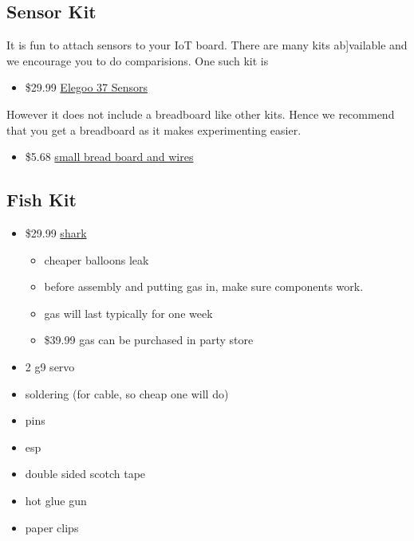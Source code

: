 \subsection{Sensor Kit}\label{sensor-kit}

It is fun to attach sensors to your IoT board. There are many kits
ab{]}vailable and we encourage you to do comparisions. One such kit is

\begin{itemize}
\tightlist
\item
  \$29.99
  \href{https://www.amazon.com/Elegoo-Upgraded-Modules-Tutorial-Arduino/dp/B01MG49ZQ5/ref=sr_1_7?s=electronics\&ie=UTF8\&qid=1499251441\&sr=1-7\&keywords=elegoo}{Elegoo
  37 Sensors}
\end{itemize}

However it does not include a breadboard like other kits. Hence we
recommend that you get a breadboard as it makes experimenting easier.

\begin{itemize}
\tightlist
\item
  \$5.68
  \href{https://www.amazon.com/Elegoo-Premium-Female-tie-points-breadboard/dp/B06XB8TZVC/ref=sr_1_23?s=electronics\&ie=UTF8\&qid=1499251600\&sr=1-23\&keywords=elegoo}{small
  bread board and wires}
\end{itemize}

\subsection{Fish Kit}\label{fish-kit}

\begin{itemize}
\tightlist
\item
  \$29.99
  \href{https://www.amazon.com/Swimmer-Inflatable-Flying-Replacement-Balloon/dp/B00658LN3E/ref=pd_bxgy_21_img_2?_encoding=UTF8\&pd_rd_i=B00658LN3E\&pd_rd_r=F71N2YCYE6Z0BCCEPQJC\&pd_rd_w=AwYab\&pd_rd_wg=rHTnv\&psc=1\&refRID=F71N2YCYE6Z0BCCEPQJC}{shark}

  \begin{itemize}
  \tightlist
  \item
    cheaper balloons leak
  \item
    before assembly and putting gas in, make sure components work.
  \item
    gas will last typically for one week
  \item
    \$39.99 gas can be purchased in party store
  \end{itemize}
\item
  2 g9 servo
\item
  soldering (for cable, so cheap one will do)
\item
  pins
\item
  esp
\item
  double sided scotch tape
\item
  hot glue gun
\item
  paper clips
\end{itemize}

